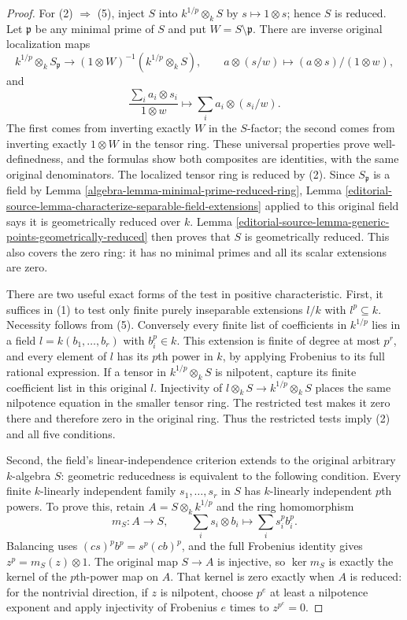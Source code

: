 \begin{proof}
For (2) $\Rightarrow$ (5), inject $S$ into
$k^{1/p}\otimes_k S$ by $s\mapsto1\otimes s$;
hence $S$ is reduced. Let $\mathfrak p$ be any
minimal prime of $S$ and put $W=S\setminus\mathfrak p$.
There are inverse original localization maps
$$
k^{1/p}\otimes_k S_{\mathfrak p}
\longrightarrow (1\otimes W)^{-1}(k^{1/p}\otimes_k S),
\qquad a\otimes(s/w)\longmapsto (a\otimes s)/(1\otimes w),
$$
and
$$
\frac{\sum_i a_i\otimes s_i}{1\otimes w}
\longmapsto\sum_i a_i\otimes(s_i/w).
$$
The first comes from inverting exactly $W$ in
the $S$-factor; the second comes from inverting
exactly $1\otimes W$ in the tensor ring. These
universal properties prove well-definedness,
and the formulas show both composites are
identities, with the same original denominators.
The localized tensor ring is reduced by (2).
Since $S_{\mathfrak p}$ is a field by Lemma
\ref{algebra-lemma-minimal-prime-reduced-ring}, Lemma
\ref{editorial-source-lemma-characterize-separable-field-extensions}
applied to this original field says it is
geometrically reduced over $k$. Lemma
\ref{editorial-source-lemma-generic-points-geometrically-reduced}
then proves that $S$ is geometrically reduced.
This also covers the zero ring: it has no
minimal primes and all its scalar extensions
are zero.

There are two useful exact forms of the test in
positive characteristic. First, it suffices in
(1) to test only finite purely inseparable
extensions $l/k$ with $l^p\subseteq k$.
Necessity follows from (5). Conversely every
finite list of coefficients in $k^{1/p}$ lies
in a field $l=k(b_1,\ldots,b_r)$ with $b_i^p\in k$.
This extension is finite of degree at most $p^r$,
and every element of $l$ has its $p$th power in
$k$, by applying Frobenius to its full rational
expression. If a tensor in $k^{1/p}\otimes_k S$
is nilpotent, capture its finite coefficient
list in this original $l$. Injectivity of
$l\otimes_k S\to k^{1/p}\otimes_k S$ places the
same nilpotence equation in the smaller tensor
ring. The restricted test makes it zero there
and therefore zero in the original ring.
Thus the restricted tests imply (2) and all
five conditions.

Second, the field's linear-independence criterion
extends to the original arbitrary $k$-algebra $S$:
geometric reducedness is equivalent to the
following condition. Every finite $k$-linearly
independent family $s_1,\ldots,s_r$ in $S$ has
$k$-linearly independent $p$th powers. To prove
this, retain $A=S\otimes_k k^{1/p}$ and the ring
homomorphism
$$
m_S:A\longrightarrow S,\qquad
\sum_i s_i\otimes b_i\longmapsto\sum_i s_i^p b_i^p.
$$
Balancing uses $(cs)^p b^p=s^p(cb)^p$, and the
full Frobenius identity gives
$z^p=m_S(z)\otimes1$. The original map
$S\to A$ is injective, so $\ker m_S$ is exactly
the kernel of the $p$th-power map on $A$.
That kernel is zero exactly when $A$ is reduced:
for the nontrivial direction, if $z$ is nilpotent,
choose $p^e$ at least a nilpotence exponent and
apply injectivity of Frobenius $e$ times to
$z^{p^e}=0$.


\end{proof}

